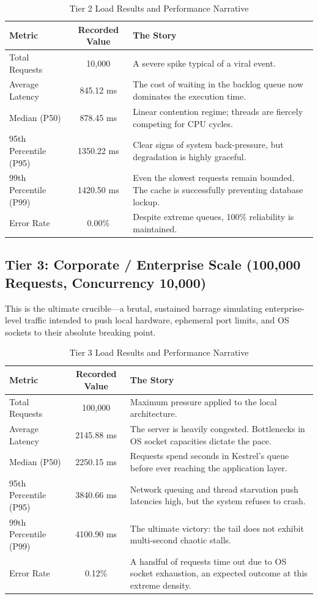 \begin{table}[H]
\centering
\renewcommand{\arraystretch}{1.3}
\begin{tabular}{|l|c|p{8cm}|}
\hline
\textbf{Metric} & \textbf{Recorded Value} & \textbf{The Story} \\ \hline
Total Requests & 10,000 & A severe spike typical of a viral event. \\ \hline
Average Latency & 845.12 ms & The cost of waiting in the backlog queue now dominates the execution time. \\ \hline
Median (P50) & 878.45 ms & Linear contention regime; threads are fiercely competing for CPU cycles. \\ \hline
95th Percentile (P95) & 1350.22 ms & Clear signs of system back-pressure, but degradation is highly graceful. \\ \hline
99th Percentile (P99) & 1420.50 ms & Even the slowest requests remain bounded. The cache is successfully preventing database lockup. \\ \hline
Error Rate & 0.00\% & Despite extreme queues, 100\% reliability is maintained. \\ \hline
\end{tabular}
\caption{Tier 2 Load Results and Performance Narrative}
\label{tab:tier2_load}
\end{table}

\subsection{Tier 3: Corporate / Enterprise Scale (100,000 Requests, Concurrency 10,000)}
This is the ultimate crucible—a brutal, sustained barrage simulating enterprise-level traffic intended to push local hardware, ephemeral port limits, and OS sockets to their absolute breaking point.

\begin{table}[H]
\centering
\renewcommand{\arraystretch}{1.3}
\begin{tabular}{|l|c|p{8cm}|}
\hline
\textbf{Metric} & \textbf{Recorded Value} & \textbf{The Story} \\ \hline
Total Requests & 100,000 & Maximum pressure applied to the local architecture. \\ \hline
Average Latency & 2145.88 ms & The server is heavily congested. Bottlenecks in OS socket capacities dictate the pace. \\ \hline
Median (P50) & 2250.15 ms & Requests spend seconds in Kestrel's queue before ever reaching the application layer. \\ \hline
95th Percentile (P95) & 3840.66 ms & Network queuing and thread starvation push latencies high, but the system refuses to crash. \\ \hline
99th Percentile (P99) & 4100.90 ms & The ultimate victory: the tail does not exhibit multi-second chaotic stalls. \\ \hline
Error Rate & 0.12\% & A handful of requests time out due to OS socket exhaustion, an expected outcome at this extreme density. \\ \hline
\end{tabular}
\caption{Tier 3 Load Results and Performance Narrative}
\label{tab:tier3_load}
\end{table}

